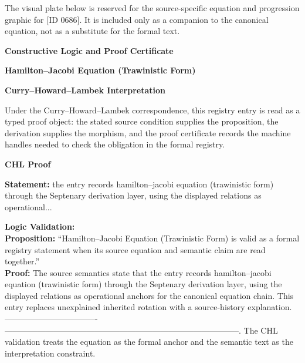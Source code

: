 \begingroup\footnotesize\sloppy
The visual plate below is reserved for the source-specific equation and progression graphic for [ID 0686]. It is included only as a companion to the canonical equation, not as a substitute for the formal text.
\par\endgroup
\ifTZPDarkEdition
{}
\fi

\clearpage
\begingroup\tzpsupportsetup
\noindent\textbf{\fontsize{10.8pt}{12.8pt}\selectfont [ID 0686] Constructive Logic and Proof Certificate}\par
\noindent\textbf{\fontsize{10pt}{12pt}\selectfont Hamilton--Jacobi Equation (Trawinistic Form)}\par
\vspace{0.45em}
\begingroup
\footnotesize
\setlength{\parskip}{0.22em}
\setlength{\parindent}{0pt}
\noindent\textbf{Curry--Howard--Lambek Interpretation}\par
Under the Curry--Howard--Lambek correspondence, this registry entry is read as a typed proof
object: the stated source condition supplies the proposition, the derivation supplies the
morphism, and the proof certificate records the machine handles needed to check the obligation
in the formal registry.

\vspace{0.45em}
\noindent\textbf{CHL Proof}\par
\textbf{Statement:} the entry records hamilton--jacobi equation (trawinistic form) through the Septenary
derivation layer, using the displayed relations as operational...

\textbf{Logic Validation:}\\
\textbf{Proposition:} ``Hamilton--Jacobi Equation (Trawinistic Form) is valid as a formal registry statement
when its source equation and semantic claim are read together.''\\
\textbf{Proof:} The source semantics state that the entry records hamilton--jacobi equation (trawinistic
form) through the Septenary derivation layer, using the displayed relations as
operational anchors for the canonical equation chain. This entry replaces unexplained
inherited rotation with a source-history explanation. ----------------------------------
--------------------------------------------------------------------------------------.
The CHL validation treats the equation as the formal anchor and the semantic text as the
interpretation constraint.

